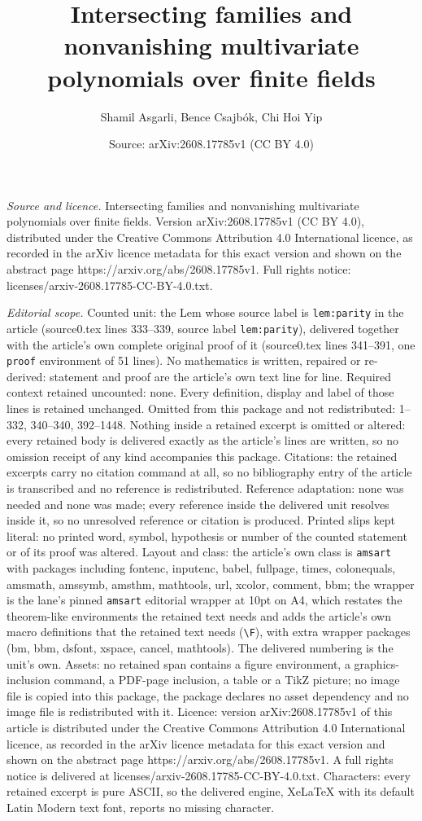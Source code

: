 \documentclass[10pt,a4paper]{amsart}
\title[Intersecting families and nonvanishing multivariate polynomi]{Intersecting families and nonvanishing multivariate polynomials over finite fields}
\author{Shamil Asgarli, Bence Csajb\'{o}k, Chi Hoi Yip}
\date{Source: arXiv:2608.17785v1 (CC BY 4.0)}
\begin{document}
\maketitle

\noindent\emph{Source and licence.} Intersecting families and nonvanishing multivariate polynomials over finite fields. Version arXiv:2608.17785v1 (CC BY 4.0), distributed under the Creative Commons Attribution 4.0 International licence, as recorded in the arXiv licence metadata for this exact version and shown on the abstract page https://arxiv.org/abs/2608.17785v1. Full rights notice: licenses/arxiv-2608.17785-CC-BY-4.0.txt.\par\smallskip

\noindent\textit{Editorial scope.} Counted unit: the Lem whose source label is \texttt{lem:parity} in the article (source0.tex lines 333--339, source label \texttt{lem:parity}), delivered together with the article's own complete original proof of it (source0.tex lines 341--391, one \texttt{proof} environment of 51 lines). No mathematics is written, repaired or re-derived: statement and proof are the article's own text line for line. Required context retained uncounted: none. Every definition, display and label of those lines is retained unchanged. Omitted from this package and not redistributed: 1--332, 340--340, 392--1448. Nothing inside a retained excerpt is omitted or altered: every retained body is delivered exactly as the article's lines are written, so no omission receipt of any kind accompanies this package. Citations: the retained excerpts carry no citation command at all, so no bibliography entry of the article is transcribed and no reference is redistributed. Reference adaptation: none was needed and none was made; every reference inside the delivered unit resolves inside it, so no unresolved reference or citation is produced. Printed slips kept literal: no printed word, symbol, hypothesis or number of the counted statement or of its proof was altered. Layout and class: the article's own class is \texttt{amsart} with packages including fontenc, inputenc, babel, fullpage, times, colonequals, amsmath, amssymb, amsthm, mathtools, url, xcolor, comment, bbm; the wrapper is the lane's pinned \texttt{amsart} editorial wrapper at 10pt on A4, which restates the theorem-like environments the retained text needs and adds the article's own macro definitions that the retained text needs (\texttt{\textbackslash F}), with extra wrapper packages (bm, bbm, dsfont, xspace, cancel, mathtools). The delivered numbering is the unit's own. Assets: no retained span contains a figure environment, a graphics-inclusion command, a PDF-page inclusion, a table or a TikZ picture; no image file is copied into this package, the package declares no asset dependency and no image file is redistributed with it. Licence: version arXiv:2608.17785v1 of this article is distributed under the Creative Commons Attribution 4.0 International licence, as recorded in the arXiv licence metadata for this exact version and shown on the abstract page https://arxiv.org/abs/2608.17785v1. A full rights notice is delivered at licenses/arxiv-2608.17785-CC-BY-4.0.txt. Characters: every retained excerpt is pure ASCII, so the delivered engine, XeLaTeX with its default Latin Modern text font, reports no missing character.
\end{document}
